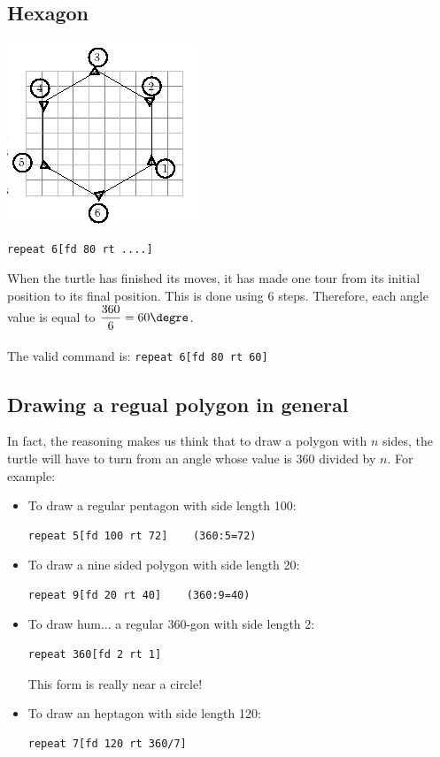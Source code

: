 \subsection{Hexagon}
\begin{center}
\includegraphics{pics/bases-hexagone.png}
\end{center}
\noindent \begin{verbatim}
repeat 6[fd 80 rt ....]
\end{verbatim}
When the turtle has finished its moves, it has made one tour from its initial position to its final position. This is done using 6 steps. Therefore, each angle value is equal to  $\dfrac{360}{6}=60\textrm{\degre}$. \\ \\
The valid command is: \texttt{repeat 6[fd 80 rt 60]}

\subsection{Drawing a regual polygon in general}
\noindent In fact, the reasoning makes us think that to draw a polygon with $n$ sides, the turtle will have to turn from an angle whose value is 360 divided by $n$. For example:
\begin{itemize}
\item To draw a regular pentagon with side length 100:
\begin{verbatim}
repeat 5[fd 100 rt 72]    (360:5=72)
\end{verbatim}
\item To draw a nine sided polygon with side length 20:
\begin{verbatim}
repeat 9[fd 20 rt 40]    (360:9=40)
\end{verbatim}
\item To draw hum... a regular 360-gon with side length 2:
\begin{verbatim}
repeat 360[fd 2 rt 1]  
\end{verbatim}
This form is really near a circle!
\item To draw an heptagon with  side length 120:
\begin{verbatim}
repeat 7[fd 120 rt 360/7]
\end{verbatim}
\end{itemize}


